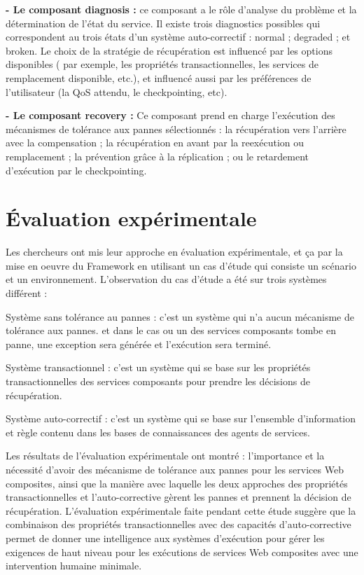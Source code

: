 \textbf{- Le composant diagnosis :} ce composant a le rôle d'analyse du problème et la détermination de l'état du service.
Il existe trois diagnostics possibles qui correspondent au trois états d'un système auto-correctif : normal ; degraded ; et broken. Le choix de la stratégie de récupération est influencé par les options disponibles ( par exemple, les propriétés transactionnelles, les services de remplacement disponible, etc.), et influencé aussi par les préférences de l'utilisateur (la QoS attendu, le checkpointing, etc).

\textbf{- Le composant recovery : }  Ce composant prend en charge l'exécution des mécanismes de tolérance aux pannes sélectionnés : la récupération vers l'arrière avec la compensation ; la récupération en avant par la reexécution ou remplacement ; la prévention grâce à la réplication ; ou le retardement d'exécution par le checkpointing.

\section{Évaluation expérimentale }

Les chercheurs ont mis leur approche en évaluation expérimentale, et ça par la mise en oeuvre du Framework  en utilisant un cas d'étude qui consiste un scénario et un environnement.
L'observation du cas d'étude a été sur trois systèmes différent :

Système sans tolérance au pannes : c'est un système qui n'a aucun mécanisme de tolérance aux pannes. et dans le cas ou un des services composants tombe en panne, une exception sera générée et l'exécution sera terminé.

Système transactionnel : c'est un système qui se base sur les propriétés transactionnelles des services composants pour prendre les décisions de récupération.

Système auto-correctif :  c'est un système qui se base sur l'ensemble d'information et règle contenu dans les bases de connaissances des agents de services.


Les résultats de l'évaluation expérimentale ont montré : l'importance et la nécessité d'avoir des mécanisme de tolérance aux pannes pour les services Web composites, ainsi que la manière avec laquelle les deux approches des propriétés transactionnelles et l'auto-corrective gèrent les pannes et prennent la décision de récupération.
L'évaluation expérimentale faite pendant cette étude suggère que la combinaison des propriétés transactionnelles avec des capacités d'auto-corrective permet de donner une intelligence aux systèmes d'exécution pour gérer les exigences de haut niveau pour les exécutions de services Web composites avec une intervention humaine minimale\cite{1}.

